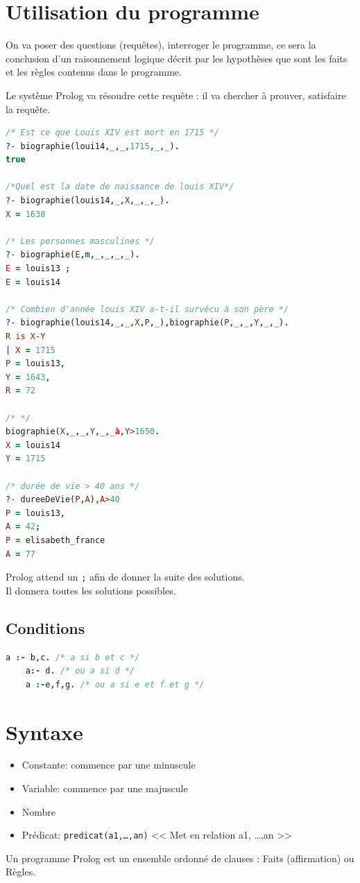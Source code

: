\documentclass[12pt,a4paper,openany]{book}
\begin{document}
		\section{Utilisation du programme}
		On va poser des questions (requêtes), interroger le programme, ce sera la conclusion d'un raisonnement logique décrit par les hypothèses que
		sont les faits et les règles contenus dans le programme.

		Le système Prolog va résoudre cette requête : il va chercher à prouver, satisfaire la requête.

		\begin{exemple}
		\begin{lstlisting}[language=Prolog, framerule=0pt]
/* Est ce que Louis XIV est mort en 1715 */
?- biographie(loui14,_,_,1715,_,_).
true

/*Quel est la date de naissance de louis XIV*/
?- biographie(louis14,_,X,_,_,_).
X = 1638

/* Les personnes masculines */
?- biographie(E,m,_,_,_,_).
E = louis13 ; 
E = louis14

/* Combien d'année louis XIV a-t-il survécu à son père */
?- biographie(louis14,_,_,X,P,_),biographie(P,_,_,Y,_,_).
R is X-Y
| X = 1715
P = louis13,
Y = 1643,
R = 72

/* */
biographie(X,_,_,Y,_,_à,Y>1650.
X = louis14
Y = 1715

/* durée de vie > 40 ans */
?- dureeDeVie(P,A),A>40
P = louis13,
A = 42;
P = elisabeth_france
A = 77
		\end{lstlisting}
		\begin{remarque}
			Prolog attend un \texttt{;} afin de donner la suite des solutions. \\Il donnera toutes les solutions possibles.
		\end{remarque}
		\end{exemple}
		\subsection{Conditions}
		\begin{lstlisting}[language=Prolog, framerule=0pt]
		a :- b,c. /* a si b et c */
	a:- d. /* ou a si d */
	a :-e,f,g. /* ou a si e et f et g */
		\end{lstlisting}

		\section{Syntaxe}
		\begin{itemize}
			\item Constante: commence par une minuscule
			\item Variable: commence par une majuscule
			\item Nombre
			\item Prédicat: \texttt{predicat(a1,\ldots,an)}  << Met en relation a1, \ldots,an >>
		\end{itemize}
		\begin{remarque}
			Un programme Prolog est un ensemble ordonné de clauses : Faits (affirmation) ou Règles.\\~
		\end{remarque}
\end{document}
